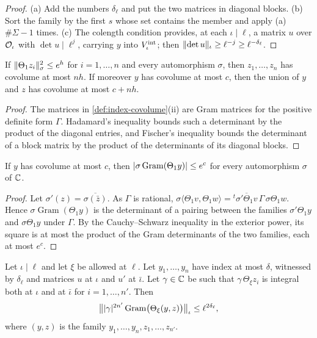 \begin{proof}
(a) Add the numbers $\delta_\ell$ and put the two matrices in diagonal blocks. (b) Sort the family by
the first $s$ whose set contains the member and apply (a) $\#\Sigma-1$ times. (c) The colength condition
provides, at each $\iota\mid\ell$, a matrix $u$ over $\mathcal{O}_\iota$ with $\det u\mid\ell^j$, carrying $y$
into $V^{\rm int}_\iota$; then $\lVert \det u\rVert_\iota\ge\ell^{-j}\ge\ell^{-\delta_\ell}$.
\end{proof}

\begin{lemma}\label{lem:hadamard}
If $\lVert \Theta_1z_i\rVert_\sigma^2\le e^h$ for $i=1,\dots,n$ and every automorphism $\sigma$, then
$z_1,\dots,z_n$ has covolume at most $nh$. If moreover $y$ has covolume at most $c$, then the union of
$y$ and $z$ has covolume at most $c+nh$.
\end{lemma}

\begin{proof}
The matrices in \cref{def:index-covolume}(ii) are Gram matrices for the positive definite form
$\Gamma$. Hadamard's inequality bounds such a determinant by the product of the diagonal entries, and
Fischer's inequality bounds the determinant of a block matrix by the product of the determinants of
its diagonal blocks.
\end{proof}

\begin{lemma}\label{lem:gram-conjugates}
If $y$ has covolume at most $c$, then $\lvert \sigma\operatorname{Gram}(\Theta_1y)\rvert\le e^c$ for every
automorphism $\sigma$ of $\mathbb{C}$.
\end{lemma}

\begin{proof}
Let $\sigma'(z)=\overline{\sigma(\bar z)}$. As $\Gamma$ is rational,
$\sigma\langle\Theta_1v,\Theta_1w\rangle={}^t\overline{\sigma'\Theta_1v}\,\Gamma\,\sigma\Theta_1w$.
Hence $\sigma\operatorname{Gram}(\Theta_1y)$ is the determinant of a pairing between the families
$\sigma'\Theta_1y$ and $\sigma\Theta_1y$ under $\Gamma$. By the Cauchy--Schwarz inequality in the
exterior power, its square is at most the product of the Gram determinants of the two families, each
at most $e^c$.
\end{proof}

\begin{lemma}\label{lem:gram-valuation}
Let $\iota\mid\ell$ and let $\xi$ be allowed at $\ell$. Let $y_1,\dots,y_n$ have index at most
$\delta$, witnessed by $\delta_\ell$ and matrices $u$ at $\iota$ and $u'$ at $\bar\iota$. Let
$\gamma\in\mathbb{C}$ be such that $\gamma\,\Theta_\xi z_i$ is integral both at $\iota$ and at $\bar\iota$ for
$i=1,\dots,n'$. Then
\[
  \bigl\lVert\lvert \gamma\rvert^{2n'}\operatorname{Gram}\bigl(\Theta_\xi(y,z)\bigr)\bigr\rVert_\iota
  \le\ell^{2\delta_\ell},
\]
where $(y,z)$ is the family $y_1,\dots,y_n,z_1,\dots,z_{n'}$.
\end{lemma}

